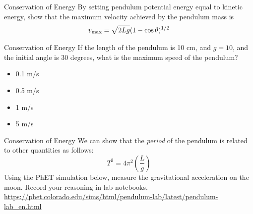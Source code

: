 \documentclass{beamer}
\begin{document}
\begin{frame}{Conservation of Energy}
By setting pendulum potential energy equal to kinetic energy, show that the maximum velocity achieved by the pendulum mass is
\begin{equation}
v_{\rm max} = \sqrt{2Lg}(1-\cos\theta)^{1/2}
\end{equation}
\end{frame}

\begin{frame}{Conservation of Energy}
If the length of the pendulum is 10 cm, and $g = 10$, and the initial angle is 30 degrees, what is the maximum speed of the pendulum? 
\begin{itemize}
\item 0.1 m/s
\item 0.5 m/s
\item 1 m/s
\item 5 m/s
\end{itemize}
\end{frame}

\begin{frame}{Conservation of Energy}
We can show that the \textit{period} of the pendulum is related to other quantities as follows:
\begin{equation}
T^2 = 4\pi^2 \left(\frac{L}{g}\right)
\end{equation}
Using the PhET simulation below, measure the gravitational acceleration on the moon.  Record your reasoning in lab notebooks. \\ \vspace{1cm}
\url{https://phet.colorado.edu/sims/html/pendulum-lab/latest/pendulum-lab_en.html}
\end{frame}
\end{document}
